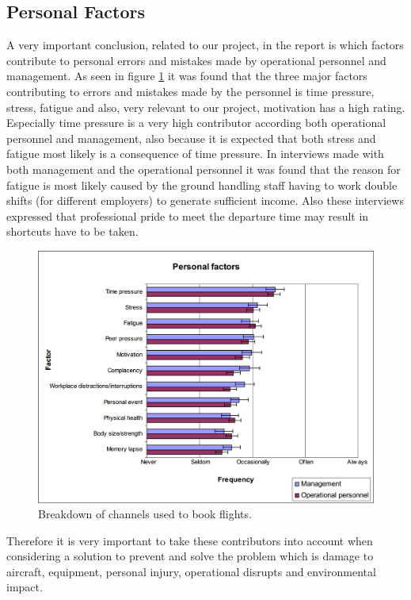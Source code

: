 \subsection{Personal Factors} %
A very important conclusion, related to our project, in the report is which factors contribute to personal errors and mistakes made by operational personnel and management. As seen in figure \ref{PersonalFactors} it was found that the three major factors contributing to errors and mistakes made by the personnel is time pressure, stress, fatigue and also, very relevant to our project, motivation has a high rating. Especially time pressure is a very high contributor according both operational personnel and management, also because it is expected that both stress and fatigue most likely is a consequence of time pressure. In interviews made with both management and the operational personnel it was found that the reason for fatigue is most likely caused by the ground handling staff having to work double shifts (for different employers) to generate sufficient income. Also these interviews expressed that professional pride to meet the departure time may result in shortcuts have to be taken.

\begin{figure}[H]
\centering
\includegraphics[width=\textwidth]{Grafik/PersonalFactors}
\caption{Breakdown of channels used to book flights.}
\label{PersonalFactors}
\end{figure}

Therefore it is very important to take these contributors into account when considering a solution to prevent and solve the problem which is damage to aircraft, equipment, personal injury, operational disrupts and environmental impact.

